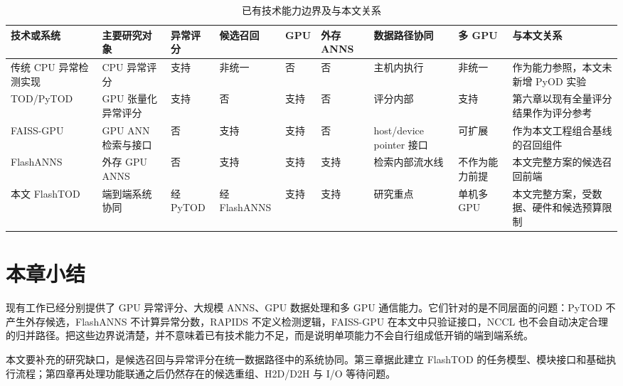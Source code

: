 \begin{table}[!htbp]
  \caption{已有技术能力边界及与本文关系}
  \label{tab:technology-boundary}
  \centering
  \scriptsize
  \setlength{\tabcolsep}{1.0pt}
  \renewcommand{\arraystretch}{1.18}
  \begin{tabularx}{\linewidth}{@{}P{1.70cm}P{1.85cm}C{0.85cm}C{1.35cm}C{0.65cm}C{0.95cm}P{1.60cm}P{1.20cm}Y@{}}
    \toprule
    技术或系统 & 主要研究对象 & 异常评分 & 候选召回 & GPU & 外存 ANNS & 数据路径协同 & 多 GPU & 与本文关系 \\
    \midrule
    传统 CPU 异常检测实现 & CPU 异常评分 & 支持 & 非统一 & 否 & 否 & 主机内执行 & 非统一 & 作为能力参照，本文未新增 PyOD 实验 \\
    TOD/PyTOD\citep{zhao2022tod} & GPU 张量化异常评分 & 支持 & 否 & 支持 & 否 & 评分内部 & 支持 & 第六章以现有全量评分结果作为评分参考 \\
    FAISS-GPU\citep{johnson2019faiss,faiss_gpu_wiki} & GPU ANN 检索与接口 & 否 & 支持 & 支持 & 否 & host/device pointer 接口 & 可扩展 & 作为本文工程组合基线的召回组件 \\
    FlashANNS\citep{xiao2025flashanns} & 外存 GPU ANNS & 否 & 支持 & 支持 & 支持 & 检索内部流水线 & 不作为能力前提 & 本文完整方案的候选召回前端 \\
    本文 FlashTOD & 端到端系统协同 & 经\newline PyTOD & 经\newline FlashANNS & 支持 & 支持 & 研究重点 & 单机多 GPU & 本文完整方案，受数据、硬件和候选预算限制 \\
    \bottomrule
  \end{tabularx}
\end{table}

\section{本章小结}

现有工作已经分别提供了 GPU 异常评分、大规模 ANNS、GPU 数据处理和多 GPU 通信能力。它们针对的是不同层面的问题：PyTOD 不产生外存候选，FlashANNS 不计算异常分数，RAPIDS 不定义检测逻辑，FAISS-GPU 在本文中只验证接口，NCCL 也不会自动决定合理的归并路径。把这些边界说清楚，并不意味着已有技术能力不足，而是说明单项能力不会自行组成低开销的端到端系统。

本文要补充的研究缺口，是候选召回与异常评分在统一数据路径中的系统协同。第三章据此建立 FlashTOD 的任务模型、模块接口和基础执行流程；第四章再处理功能联通之后仍然存在的候选重组、H2D/D2H 与 I/O 等待问题。
